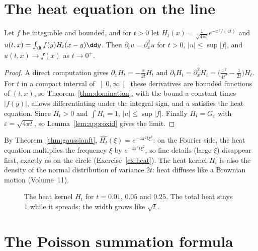 \section{The heat equation on the line}

\begin{proposition}\label{prop:heatline}
Let $f$ be integrable and bounded, and for $t>0$ let $H_t(x)=\frac1{\sqrt{4\pi t}}e^{-x^2/(4t)}$ and $u(t,x)=\int_{\R}f(y)H_t(x-y)\dd y$. Then $\partial_tu=\partial_x^2u$ for
$t>0$, $|u|\le\sup|f|$, and $u(t,x)\to f(x)$ as $t\to0^+$.
\end{proposition}
\begin{proof}
A direct computation gives $\partial_xH_t=-\frac x{2t}H_t$ and $\partial_tH_t=\partial_x^2H_t=\bigl(\frac{x^2}{4t^2}-\frac1{2t}\bigr)H_t$. For $t$ in a compact interval of $\left]0,\infty\right[$ these
derivatives are bounded functions of $(t,x)$, so Theorem~\ref{thm:domination}, with the bound a constant times $|f(y)|$, allows differentiating
under the integral sign, and $u$ satisfies the heat equation. Since $H_t>0$ and $\int H_t=1$, $|u|\le\sup|f|$. Finally $H_t=G_\varepsilon$ with $\varepsilon=\sqrt{4\pi t}$, so
Lemma~\ref{lem:approxid} gives the limit.
\end{proof}

By Theorem~\ref{thm:gaussianft}, $\widehat{H_t}(\xi)=e^{-4\pi^2t\xi^2}$: on the Fourier side, the heat equation multiplies the frequency $\xi$ by $e^{-4\pi^2t\xi^2}$, so
fine details (large $\xi$) disappear first, exactly as on the circle (Exercise~\ref{ex:heat}). The heat kernel $H_t$ is also the density of the
normal distribution of variance $2t$: heat diffuses like a Brownian motion (Volume~11).

\begin{figure}[ht]
\centering
{}
\caption{The heat kernel $H_t$ for $t=0.01$, $0.05$ and $0.25$. The total heat stays $1$ while it spreads; the width grows like $\sqrt t$.}
\label{fig:heat}
\end{figure}

\section{The Poisson summation formula}

